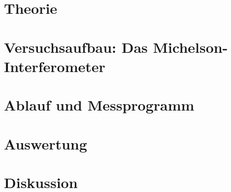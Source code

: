 \documentclass[a4,11pt]{article}
\newcommand{\V}{V401}
\begin{document}



\tableofcontents
\clearpage


\section{Theorie}

\clearpage


\section{Versuchsaufbau: Das Michelson-Interferometer}

\clearpage


\section{Ablauf und Messprogramm}

\clearpage


\section{Auswertung}
%
%

\clearpage


\section{Diskussion}


\clearpage
\listoftodos
\listoffigures
\listoftables
\clearpage
\nocite{\V}
\printbibliography[title = Literaturverzeichnis]
\end{document}
